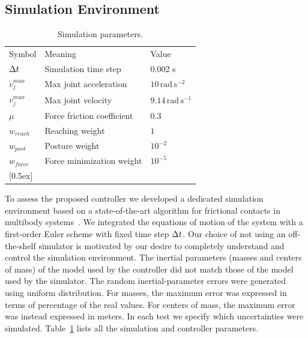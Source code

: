 \subsection{Simulation Environment}
\begin{table}[!tbp] 
\caption{Simulation parameters.}
\centering 
\begin{tabular}{p{1.1cm} | p{3.8cm} p{1.8cm}}
\hline 
	Symbol		& Meaning 				& Value \\ \rowcolor[gray]{.9}
\hline 
	$\Delta t$			& Simulation time step 		& 0.002 s \\
	$\dot{v}_j^{max}$ & Max joint acceleration		& $10 \, \text{rad} \, \text{s}^{-2}$ \\ \rowcolor[gray]{.9}
	$v_j^{max}$	& Max joint velocity			& $9.14 \, \text{rad} \, \text{s}^{-1}$ \\
	$\mu$		& Force friction coefficient		& 0.3 \\  \rowcolor[gray]{.9}
	$w_{reach}$	& Reaching weight 		& $1$ \\ 
	$w_{post}$ 	& Posture weight 			& $10^{-2}$ \\ \rowcolor[gray]{.9}
	$w_{force}$ & Force minimization weight 			& $10^{-5}$ \\ 
[0.5ex] \hline 
\end{tabular} 
\label{table:simu_params} %
\end{table}
To assess the proposed controller we developed a dedicated simulation environment based on a state-of-the-art algorithm for frictional contacts in multibody systems~\cite{Kaufman2008}. 
We integrated the equations of motion of the system with a first-order Euler scheme with fixed time step $\Delta t$.
Our choice of not using an off-the-shelf simulator is motivated by our desire to completely understand and control the simulation environment. 
The inertial parameters (masses and centers of mass) of the model used by the controller did not match those of the model used by the simulator. 
The random inertial-parameter errors were generated using uniform distribution. 
For masses, the maximum error was expressed in terms of percentage of the real values. 
For centers of mass, the maximum error was instead expressed in meters. 
In each test we specify which uncertainties were simulated. 
Table~\ref{table:simu_params} lists all the simulation and controller parameters.

